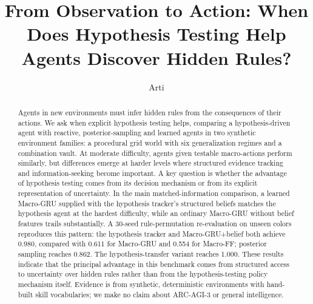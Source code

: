 \documentclass[runningheads]{llncs}
\begin{document}
\title{From Observation to Action: When Does Hypothesis Testing Help Agents Discover Hidden Rules?}
\author{Arti}
\maketitle

\begin{abstract}
Agents in new environments must infer hidden rules from the consequences of their actions. We ask when explicit hypothesis testing helps, comparing a hypothesis-driven agent with reactive, posterior-sampling and learned agents in two synthetic environment families: a procedural grid world with six generalization regimes and a combination vault. At moderate difficulty, agents given testable macro-actions perform similarly, but differences emerge at harder levels where structured evidence tracking and information-seeking become important. A key question is whether the advantage of hypothesis testing comes from its decision mechanism or from its explicit representation of uncertainty. In the main matched-information comparison, a learned Macro-GRU supplied with the hypothesis tracker's structured beliefs matches the hypothesis agent at the hardest difficulty, while an ordinary Macro-GRU without belief features trails substantially. A 30-seed rule-permutation re-evaluation on unseen colors reproduces this pattern: the hypothesis tracker and Macro-GRU+belief both achieve 0.980, compared with 0.611 for Macro-GRU and 0.554 for Macro-FF; posterior sampling reaches 0.862. The hypothesis-transfer variant reaches 1.000. These results indicate that the principal advantage in this benchmark comes from structured access to uncertainty over hidden rules rather than from the hypothesis-testing policy mechanism itself. Evidence is from synthetic, deterministic environments with hand-built skill vocabularies; we make no claim about ARC-AGI-3 or general intelligence.
\end{abstract}
\end{document}
